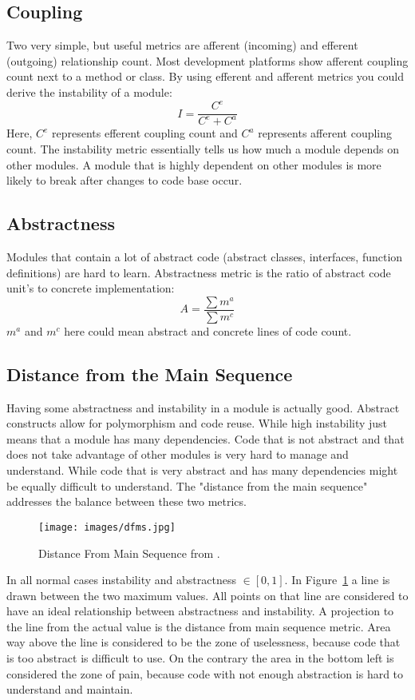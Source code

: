 \documentclass[12pt]{article}
\begin{document}
\subsection{Coupling}
Two very simple, but useful metrics are afferent (incoming) and efferent (outgoing) relationship count. Most development platforms show afferent coupling count next to a method or class. By using efferent and afferent metrics you could derive the instability of a module:
\begin{equation}
I = \frac{C^e}{C^e + C^a}
\end{equation}
Here, $C^e$ represents efferent coupling count and $C^a$ represents afferent coupling count. The instability metric essentially tells us how much a module depends on other modules. A module that is highly dependent on other modules is more likely to break after changes to code base occur.

\subsection{Abstractness}
Modules that contain a lot of abstract code (abstract classes, interfaces, function definitions) are hard to learn. Abstractness metric is the ratio of abstract code unit's to concrete implementation:
\begin{equation}
A = \frac{\sum m^a}{\sum m^c}
\end{equation}
$m^a$ and $m^c$ here could mean abstract and concrete lines of code count.

\subsection{Distance from the Main Sequence}
Having some abstractness and instability in a module is actually good. Abstract constructs allow for polymorphism and code reuse. While high instability just means that a module has many dependencies. Code that is not abstract and that does not take advantage of other modules is very hard to manage and understand. While code that is very abstract and has many dependencies might be equally difficult to understand. The "distance from the main sequence" addresses the balance between these two metrics.
\begin{figure}[H]
    \centering
    \texttt{[image: images/dfms.jpg]}
    \caption{Distance From Main Sequence from \cite{Mar15}.}
    \label{fig:dfms}
\end{figure}
In all normal cases instability and abstractness $\in [0, 1]$. In Figure~\ref{fig:dfms} a line is drawn between the two maximum values. All points on that line are considered to have an ideal relationship between abstractness and instability. A projection to the line from the actual value is the distance from main sequence metric. Area way above the line is considered to be the zone of uselessness, because code that is too abstract is difficult to use. On the contrary the area in the bottom left is considered the zone of pain, because code with not enough abstraction is hard to understand and maintain.
\end{document}
